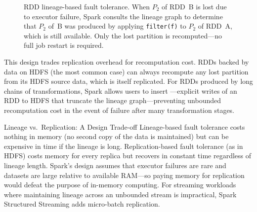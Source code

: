 \begin{figure}[h!t]
\caption{RDD lineage-based fault tolerance. When $P_2$ of RDD~B is lost
         due to executor failure, Spark consults the lineage graph to determine
         that $P_2$ of~B was produced by applying \texttt{filter(f)} to $P_2$
         of RDD~A, which is still available. Only the lost partition is
         recomputed---no full job restart is required.}
\label{fig:rdd-lineage}
\end{figure}

This design trades replication overhead for recomputation cost. RDDs
backed by data on HDFS (the most common case) can always recompute any
lost partition from its HDFS source data, which is itself replicated.
For RDDs produced by long chains of transformations, Spark allows
users to insert ---explicit writes of an RDD to HDFS
that truncate the lineage graph---preventing unbounded recomputation
cost in the event of failure after many transformation stages.

\begin{keyinsight}{Lineage vs.\ Replication: A Design Trade-off}
Lineage-based fault tolerance costs nothing in memory (no second copy
of the data is maintained) but can be expensive in time if the lineage
is long. Replication-based fault tolerance (as in HDFS) costs memory
for every replica but recovers in constant time regardless of lineage
length. Spark's design assumes that executor failures are rare and
datasets are large relative to available RAM---so paying memory for
replication would defeat the purpose of in-memory computing. For
streaming workloads where maintaining lineage across an unbounded stream
is impractical, Spark Structured Streaming adds micro-batch replication.
\end{keyinsight}

